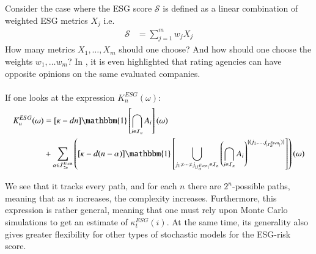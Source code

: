 Consider the case where the ESG score $\mathcal{S}$ is defined as a linear combination of weighted ESG metrics $X_{j}$ i.e.
\begin{align*}
\mathcal{S} &= \sum_{j=1}^{m}w_{j}X_{j}   
\end{align*}
How many metrics $X_{1}, \dots, X_{m}$ should one choose? And how should one choose the weights $w_{1}, \dots w_{m}$? In \cite{Billio2021}, it is even highlighted that rating agencies can have opposite opinions on the same evaluated companies. 
\\~\\ 
If one looks at the expression $K_{n}^{ESG}(\omega)$: 
\begin{align*}
K_{n}^{ESG}(\omega) &= 
[\kappa -dn]\mathbbm{1}\left[
\bigcap_{i\in \mathcal{I}_{n}}A_{i}
\right](\omega) \\ 
&+ 
\sum_{\alpha \in \mathcal{I}_{2n}^{Even}}
\left(
[\kappa -d(n-\alpha)]\mathbbm{1}\left[
\bigcup_{
j_{1}\neq \dots \neq j_{|\mathcal{I}_{\alpha}^{Even}|}
\in \mathcal{I}_{n}
}\left(
\bigcap_{i\in \mathcal{I}_{n}}A_{i}
\right)^{
\{
(j_{1}, \dots , j_{|\mathcal{I}_{\alpha}^{Even}|})
\}
}
\right]
\right)(\omega) 
\end{align*}

We see that it tracks every path, and for each $n$ there are $2^{n}$-possible paths, meaning that as $n$ increases, the complexity increases. Furthermore, this expression is rather general, meaning that one must rely upon Monte Carlo simulations to get an estimate of $\kappa_{t}^{ESG}(i)$. At the same time, its generality also gives greater flexibility  for other types of stochastic models for the ESG-risk score. 



